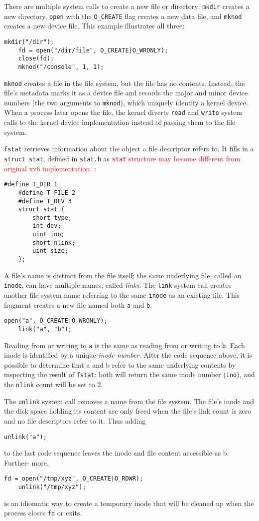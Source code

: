 \documentclass{report}
\begin{document}
	There are multiple system calls to create a new file or directory: \texttt{mkdir} creates a
	new directory, \texttt{open} with the \texttt{O\_CREATE} flag creates a new data file, and 
	\texttt{mknod} creates a new device file. This example illustrates all three:
	\begin{lstlisting}[style=c]
	mkdir("/dir");
	fd = open("/dir/file", O_CREATE|O_WRONLY);
	close(fd);
	mknod("/console", 1, 1);
	\end{lstlisting}
	\texttt{mknod} creates a file in the file system, but the file has no contents. Instead, the file's
	metadata marks it as a device file and records the major and minor device numbers
	(the two arguments to \texttt{mknod}), which uniquely identify a kernel device. When a
	process later opens the file, the kernel diverts \texttt{read} and \texttt{write} system calls to the kernel
	device implementation instead of passing them to the file system.
	
	\texttt{fstat} retrieves information about the object a file descriptor refers to. It fills in a
	\texttt{struct stat}, defined in \texttt{stat.h} as \textcolor{red}{
		\texttt{stat} structure may become different from original xv6 implementation.
	}:
	\begin{lstlisting}[style=c]
	#define T_DIR 1
	#define T_FILE 2
	#define T_DEV 3
	struct stat {
		short type;
		int dev;
		uint ino;
		short nlink;
		uint size;
	};
	\end{lstlisting}
	
	A file's name is distinct from the file itself; the same underlying file, called an 
	\texttt{inode}, can have multiple names, called \emph{links}. The \texttt{link} system call 
	creates another file
	system name referring to the same \texttt{inode} as an existing file. This fragment creates a
	new file named both \texttt{a} and \texttt{b}.
	\begin{lstlisting}[style=c]
	open("a", O_CREATE|O_WRONLY);
	link("a", "b");
	\end{lstlisting}
	Reading from or writing to \texttt{a} is the same as reading from or writing to \texttt{b}. Each inode
	is identified by a unique \emph{inode number}. After the code sequence above, it is possible to
	determine that a and b refer to the same underlying contents by inspecting the result
	of \texttt{fstat}: both will return the same inode number (\texttt{ino}), and the \texttt{nlink} count 
	will be
	set to 2.
	
	The \texttt{unlink} system call removes a name from the file system. The file's inode
	and the disk space holding its content are only freed when the file's link count is zero
	and no file descriptors refer to it. Thus adding
	\begin{lstlisting}[style=c]
	unlink("a");
	\end{lstlisting}
	to the last code sequence leaves the inode and file content accessible as b. Further-
	more,
	\begin{lstlisting}[style=c]
	fd = open("/tmp/xyz", O_CREATE|O_RDWR);
	unlink("/tmp/xyz");
	\end{lstlisting}
	is an idiomatic way to create a temporary inode that will be cleaned up when the 
	process closes \texttt{fd} or exits.
	
\end{document}
